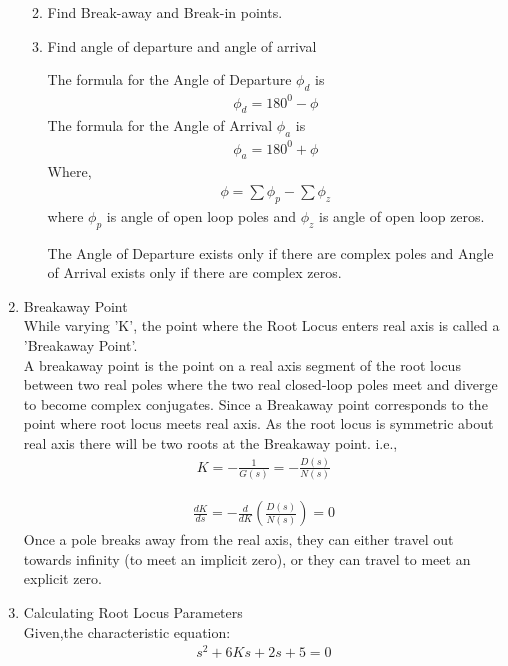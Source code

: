 \begin{enumerate}[label=\thesection.\arabic*.,ref=\thesection.\theenumi]
\begin{enumerate}
\begin{itemize}
\end{itemize}
	\item Find Break-away and Break-in points.
	\item Find angle of departure and angle of arrival

The formula for the Angle of Departure $\phi_{d}$ is
\begin{align}
\phi_{d}=180^{0}-\phi
\end{align}
The formula for the Angle of Arrival $\phi_{a}$ is
\begin{align}
\phi_{a}=180^{0}+\phi
\end{align}
Where,
\begin{align}
\phi=\sum \phi_{p}-\sum \phi_{z}
\end{align}
where $\phi_{p}$ is angle of open loop poles and $\phi_{z}$ is angle of open loop zeros.

The Angle of Departure exists only if there are complex poles and Angle of Arrival exists only if there are complex zeros.
     \end{enumerate}
    
\item Breakaway Point \\
    While varying 'K', the point where the Root Locus enters real axis is called a 'Breakaway Point'. \\
A breakaway point is the point on a real axis segment of the root locus between two real poles where the two real closed-loop poles meet and diverge to become complex conjugates. Since a Breakaway point corresponds to the point where root locus meets real axis. As the root locus is symmetric about real axis there will be two roots at the Breakaway point. 
i.e.,
    \begin{align}
        K=-\frac{1}{G(s)}=-\frac{D(s)}{N(s)}    
    \end{align}

    \begin{align}
        \frac{d K}{d s}=-\frac{d}{d K}\left(\frac{D(s)}{N(s)}\right)=0 
    \end{align}
    Once a pole breaks away from the real axis, they can either travel out towards infinity (to meet an implicit zero), or they can travel to meet an explicit zero. 



    
\item Calculating Root Locus Parameters\\
Given,the characteristic equation:
\begin{align}
    s^2 + 6Ks + 2s + 5 = 0    
\end{align}
    

\end{enumerate}
